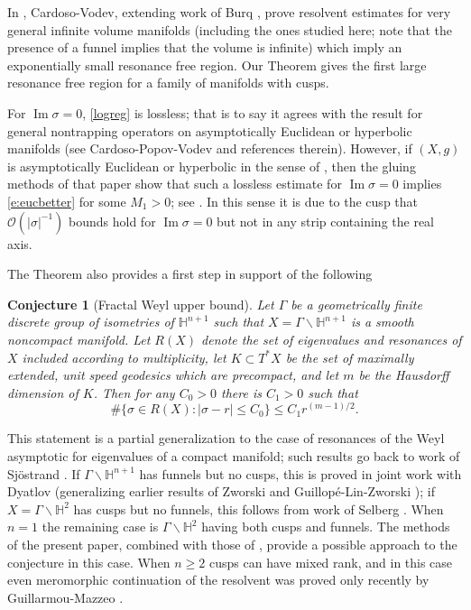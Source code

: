 \documentclass[reqno, 12pt]{amsart}
\newcommand \Hh {\mathbb{H}}
\newcommand \Oh {\mathcal{O}}
\DeclareMathOperator \im {Im}
\newtheorem*{conj}{Conjecture}
\theoremstyle{definition}
\numberwithin{equation}{section}
\numberwithin{prop}{section}
\numberwithin{figure}{section}
\begin{document}
In \cite[Corollary 1.2]{cv}, Cardoso-Vodev, extending work of Burq \cite{bu0, bu}, prove resolvent estimates for very general infinite volume manifolds (including the ones studied here; note that the presence of a funnel implies that the volume is infinite) which imply an exponentially small resonance free region. Our Theorem gives the first large resonance free region for a family of manifolds with cusps. %


 For $\im \sigma=0$, \eqref{logreg} is lossless; that is to say it agrees with the result for general nontrapping operators on asymptotically Euclidean or hyperbolic manifolds (see Cardoso-Popov-Vodev \cite[(1.6)]{cpv} and references therein).  However, if $(X,g)$ is asymptotically Euclidean or hyperbolic in the sense of \cite[\S 4]{Datchev-Vasy:Gluing}, then the gluing methods of that paper show that such a lossless estimate for $\im \sigma=0$ implies \eqref{e:eucbetter} for some $M_1>0$; see \cite{d-exten}. In this sense it is due to the cusp that $\Oh(|\sigma|^{-1})$ bounds hold for $\im \sigma=0$ but not in any strip containing the real axis.

The Theorem also provides a first step in support of the following

\begin{conj}[Fractal Weyl upper bound] Let $\Gamma$ be a geometrically finite discrete group of isometries of $\Hh^{n+1}$ such that $X = \Gamma \backslash \Hh^{n+1}$ is a smooth noncompact manifold. Let $R(X)$ denote the set of eigenvalues and resonances of $X$ included according to multiplicity, let $K \subset T^*X$ be the set of maximally extended, unit speed geodesics which are precompact, and let $m$ be the Hausdorff dimension of $K$. Then for any $C_0>0$ there is $C_1 > 0$ such that
\[\#\{\sigma \in R(X)\colon |\sigma - r| \le C_0\} \le C_1 r^{(m-1)/2}.\]
\end{conj}

This statement is a partial generalization to the case of resonances of the Weyl asymptotic for eigenvalues of a compact manifold; such results go back to work of Sj\"ostrand \cite{s}. If $\Gamma\backslash \Hh^{n+1}$ has funnels but no cusps, this is proved in joint work with Dyatlov \cite{dd} (generalizing earlier results of Zworski \cite{z} and Guillop\'e-Lin-Zworski \cite{glz}); if $X = \Gamma \backslash \Hh^2$ has cusps but no funnels, this follows from work of Selberg \cite{sel}. When $n=1$ the remaining case is  $\Gamma\backslash \Hh^2$ having both cusps and funnels. The methods of the present paper, combined with those of \cite{sz, dd}, provide a possible approach to the conjecture in this case. When $n \ge 2$ cusps can have mixed rank, and in this case even meromorphic continuation of the resolvent was proved only recently by Guillarmou-Mazzeo \cite{gm}.
 
\end{document}
